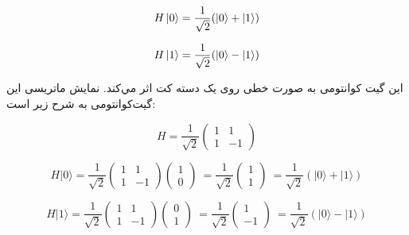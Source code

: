 \documentclass{book}
\begin{document}
\begin{center}
	\begin{equation}\label{basis to forier}
H\ket{0} = \frac{1}{\sqrt{2}} (\ket{0} + \ket{1})
\end{equation}
\end{center}
\hspace{2cm}
\begin{center}
	\begin{equation}\label{basis to forier}
H\ket{1} = \frac{1}{\sqrt{2}} (\ket{0} - \ket{1})
\end{equation}
\end{center}
\vspace{1cm}

این گیت کوانتومی‌ به صورت خطی روی یک دسته‌ کت اثر مي‌کند. نمایش ماتریسی این گیت‌کوانتومی به شرح زیر است:
\begin{center}
	\begin{equation}\label{Hadamard matrix}
		H = \frac{1}{\sqrt{2}}
		\begin{pmatrix}
			1 & 1 \\
			1 & -1
		\end{pmatrix}
	\end{equation}
\end{center}





	\begin{equation}\label{Hadamard matrix}
			H |0\rangle = \frac{1}{\sqrt{2}} \begin{pmatrix} 1 & 1 \\ 1 & -1 \end{pmatrix} \begin{pmatrix} 1 \\ 0 \end{pmatrix} \
		= \frac{1}{\sqrt{2}} \begin{pmatrix} 1 \\ 1 \end{pmatrix} \
		= \frac{1}{\sqrt{2}} (|0\rangle + |1\rangle)
	\end{equation}



	\begin{equation}\label{Hadamard on ket}
	H |1\rangle = \frac{1}{\sqrt{2}} \begin{pmatrix} 1 & 1 \\ 1 & -1 \end{pmatrix} \begin{pmatrix} 0 \\ 1 \end{pmatrix} \
	= \frac{1}{\sqrt{2}} \begin{pmatrix} 1 \\ -1 \end{pmatrix} \
	= \frac{1}{\sqrt{2}} (|0\rangle - |1\rangle)
\end{equation}
\end{document}
